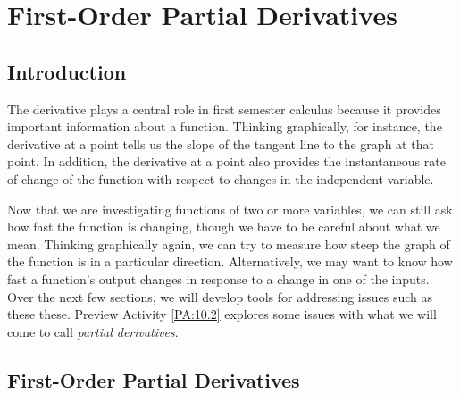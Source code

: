 \section{First-Order Partial Derivatives} \label{S:10.2.First_Order_Partial_Derivatives}

\vspace*{-14 pt}


\subsection*{Introduction}

The derivative plays a central role in first semester  calculus
because it provides important information about a function.  Thinking
graphically, for instance, the derivative at a point tells us the
slope of the tangent line to the graph at that point.  In addition, the
derivative at a point also provides the instantaneous rate of change of
the function with respect to changes in the independent variable.

Now that we are investigating functions of two or more variables, we
can still ask how fast the function is changing, though we have to be careful about what we mean.  Thinking
graphically again, we can try to measure how steep the graph of the
function is in a particular direction.  Alternatively, we may want to know how fast a function's
output changes in response to a change in one of the inputs.
Over the next few sections, we will develop tools for addressing
issues such as these these.  Preview
Activity \ref{PA:10.2} explores some issues with what we will come to call {\em partial
  derivatives}.



\subsection*{First-Order Partial Derivatives}

